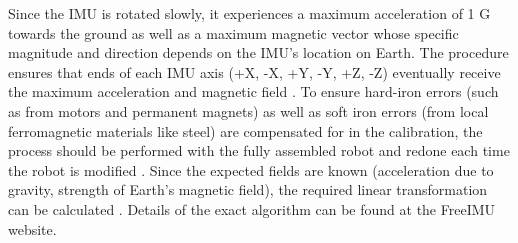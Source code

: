 Since the IMU is rotated slowly, it experiences a maximum acceleration of 1 G towards the ground as well as a maximum magnetic vector whose specific magnitude and direction depends on the IMU's location on Earth. The procedure ensures that ends of each IMU axis (+X, -X, +Y, -Y, +Z, -Z) eventually receive the maximum acceleration and magnetic field \cite{tedaldi_pretto_menegatti_2014}. To ensure hard-iron errors (such as from motors and permanent magnets) as well as soft iron errors (from local ferromagnetic materials like steel) are compensated for in the calibration, the process should be performed with the fully assembled robot and redone each time the robot is modified \cite{hard_soft_correction}. Since the expected fields are known (acceleration due to gravity, strength of Earth's magnetic field), the required linear transformation can be calculated \cite{freeimu}. Details of the exact algorithm can be found at the FreeIMU website.

